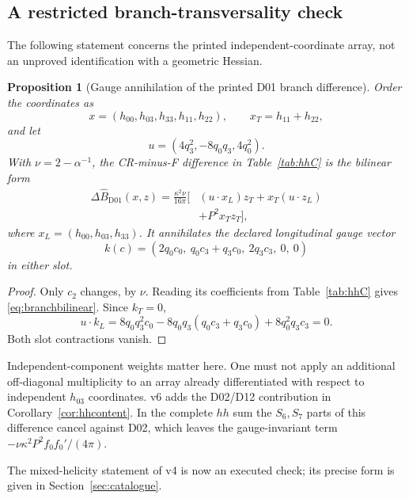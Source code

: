 \documentclass[11pt,a4paper]{article}
\newcommand{\ka}{\kappa}
\theoremstyle{plain}
\newtheorem{proposition}[theorem]{Proposition}
\theoremstyle{definition}
\theoremstyle{remark}
\numberwithin{equation}{section}
\begin{document}
\subsection{A restricted branch-transversality check}

The following statement concerns the printed independent-coordinate
array, not an unproved identification with a geometric Hessian.

\begin{proposition}[Gauge annihilation of the printed D01 branch difference]
\label{prop:branchtransverse}
Order the coordinates as
\[
x=(h_{00},h_{03},h_{33},h_{11},h_{22}),
\qquad x_T=h_{11}+h_{22},
\]
and let
\[
u=(4q_3^2,-8q_0q_3,4q_0^2).
\]
With \(\nu=2-\alpha^{-1}\), the CR-minus-F difference in
Table~\ref{tab:hhC} is the bilinear form
\begin{equation}
\begin{split}
\Delta\widehat B_{\mathrm{D01}}(x,z)
 =\frac{\ka^2\nu}{16\pi}
 \bigl[
 &(u\cdot x_L)z_T+x_T(u\cdot z_L)\\
 &+P^2x_Tz_T
 \bigr],
\end{split}
\label{eq:branchbilinear}
\end{equation}
where \(x_L=(h_{00},h_{03},h_{33})\).
It annihilates the declared longitudinal gauge vector
\begin{equation}
k(c)=
(2q_0c_0,\ q_0c_3+q_3c_0,\ 2q_3c_3,\ 0,\ 0)
\label{eq:gaugevector}
\end{equation}
in either slot.
\end{proposition}

\begin{proof}
Only \(c_2\) changes, by \(\nu\).
Reading its coefficients from Table~\ref{tab:hhC} gives
\eqref{eq:branchbilinear}.
Since \(k_T=0\),
\[
u\cdot k_L
 =8q_0q_3^2c_0
 -8q_0q_3(q_0c_3+q_3c_0)
 +8q_0^2q_3c_3=0.
\]
Both slot contractions vanish.
\end{proof}

Independent-component weights matter here.
One must not apply an additional off-diagonal multiplicity to an
array already differentiated with respect to independent
\(h_{03}\) coordinates.
v6 adds the D02/D12 contribution in
Corollary~\ref{cor:hhcontent}.
In the complete \(hh\) sum the \(S_6,S_7\) parts of this difference
cancel against D02, which leaves the gauge-invariant term
\(-\nu\ka^2P^2f_0f_0'/(4\pi)\).

The mixed-helicity statement of v4 is now an executed check; its
precise form is given in Section~\ref{sec:catalogue}.
\end{document}
